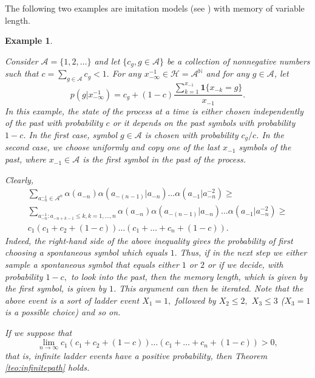 \documentclass[a4paper]{article}
\newtheorem{example}[theorem]{Example}
\newcommand{\N}{\mathbb{N}}
\renewcommand{\H}{\mathcal{H}}
\newcommand{\A}{\mathcal{A}}
\begin{document}
The following two examples are imitation models (see \cite{cff,imitation_noise}) with memory of variable length.

\begin{example} \label{ex:imitation}

Consider $\A=\{1,2,\ldots\}$ and let $ \{c_g, g \in \A \}$  be a collection of nonnegative numbers such that $c=\sum_{g\in \A}c_g <1.$ For any $x_{-\infty}^{-1}\in \H=\A^{\N}$ and for any $g\in \A$, let
\begin{equation}\label{eq:bramson-kalikow}
p(g|x_{-\infty}^{-1})=c_g+(1-c)\frac{\displaystyle \sum_{k=1}^{x_{-1}}\mathbf{1}\{x_{-k}=g\}}{x_{-1}}.
\end{equation}
In this example, the state of the process at a time is either chosen independently of the past with probability $c$ or it depends on the past symbols with probability $1-c$. In the first case, symbol $g\in \A$ is chosen with probability $c_g/c$. In the second case, we choose uniformly and copy one of the last $x_{-1}$ symbols of the past, where $x_{-1} \in \A$ is the first symbol in the past of the process.

 
Clearly, 
\begin{multline*}
\sum_{a_{-n}^{-1}\in \A^n}\alpha(a_{-n})\alpha(a_{-(n-1)}|a_{-n})\ldots \alpha(a_{-1}|a_{-n}^{-2})\geq \\ 
\sum_{a_{-n}^{-1}:a_{-n+k-1}\leq k, k=1,\ldots, n }\alpha(a_{-n})\alpha(a_{-(n-1)}|a_{-n})\ldots \alpha(a_{-1}|a_{-n}^{-2}) \geq \\ 
c_1(c_1+c_2+(1-c))\ldots (c_1+\ldots +c_n+(1-c)).
\end{multline*}
Indeed, the right-hand side of the above inequality gives the probability of first choosing a spontaneous symbol which equals $ 1.$ Thus, if in the next step we either sample a spontaneous symbol that equals either $ 1 $ or $ 2 $ or if we decide, with probability $ 1 -c , $ to look into the past, then the memory length, which is given by the first symbol, is given by $1$. This argument can then be iterated. 
Note that the above event is a sort of ladder event $ X_1 = 1,$ followed by $ X_2 \le 2,$ $ X_3 \le 3 $ ($X_3 = 1 $ is a possible choice) and so on. 


If we suppose that
\begin{equation}\label{eq:houseofcards}
    \lim_{n\to \infty} c_1(c_1+c_2+(1-c))\ldots (c_1+\ldots +c_n+(1-c))>0,
\end{equation}
that is, infinite ladder events have a positive probability, then Theorem \ref{teo:infinitepath} holds.


\end{example}
\end{document}
